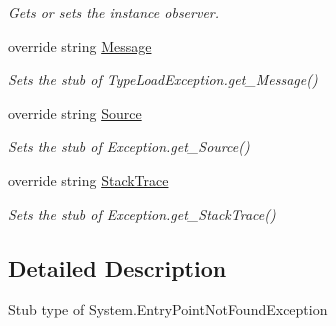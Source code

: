 \begin{DoxyCompactItemize}
\begin{DoxyCompactList}\small\item\em Gets or sets the instance observer.\end{DoxyCompactList}\item 
override string \hyperlink{class_system_1_1_fakes_1_1_stub_entry_point_not_found_exception_a12a36c63a02c705c0a2a7807d02c9057}{Message}
\begin{DoxyCompactList}\small\item\em Sets the stub of Type\-Load\-Exception.\-get\-\_\-\-Message()\end{DoxyCompactList}\item 
override string \hyperlink{class_system_1_1_fakes_1_1_stub_entry_point_not_found_exception_a2d152ae022fca026c307b8b064bf577c}{Source}
\begin{DoxyCompactList}\small\item\em Sets the stub of Exception.\-get\-\_\-\-Source()\end{DoxyCompactList}\item 
override string \hyperlink{class_system_1_1_fakes_1_1_stub_entry_point_not_found_exception_a6774c12fbebee65d0c03e08334dd79b4}{Stack\-Trace}
\begin{DoxyCompactList}\small\item\em Sets the stub of Exception.\-get\-\_\-\-Stack\-Trace()\end{DoxyCompactList}\end{DoxyCompactItemize}


\subsection{Detailed Description}
Stub type of System.\-Entry\-Point\-Not\-Found\-Exception



